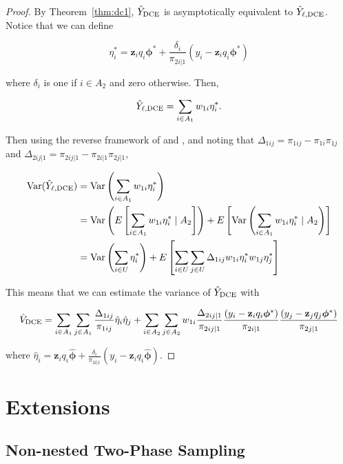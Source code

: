\documentclass[12pt]{article}
\newcommand{\Var}{{\text{Var}}}
\renewcommand{\bf}[1]{\mathbf{#1}}
\begin{document}
\begin{proof}
  By Theorem~\ref{thm:dc1}, $\hat Y_{\rm DCE}$ is asymptotically equivalent to
  $\hat Y_{\ell, \rm{DCE}}$. Notice that we can define

  $$
  \eta_i^* = 
  \bf z_i q_i \bm \phi^* + \frac{\delta_i}{\pi_{2i|1}}(y_i - \bf z_i q_i \bm \phi^*)
  $$

  where $\delta_i$ is one if $i \in A_2$ and zero otherwise. Then,

  $$
  \hat Y_{\ell, \rm{DCE}} = \sum_{i \in A_1} w_{1i} \eta_i^*.
  $$

  Then using the reverse framework of \cite{fay1992inferences} and 
  \cite{shao1999variance}, and noting that 
  $\Delta_{1ij} = \pi_{1ij} - \pi_{1i}\pi_{1j}$ and 
  $\Delta_{2ij|1} = \pi_{2ij|1} - \pi_{2i|1}\pi_{2j|1}$,

  \begin{align*}
    \Var(\hat Y_{\ell, \rm{DCE}}) 
    &= \Var\left(\sum_{i \in A_1} w_{1i} \eta_i^*\right) \\
    &= \Var\left(E\left[\sum_{i \in A_1} w_{1i} \eta_i^* \mid A_2 \right]\right) 
    + E\left[\Var\left(\sum_{i \in A_1} w_{1i} \eta_i^* \mid A_2 \right)\right] \\
    &= \Var\left(\sum_{i \in U} \eta_i^*\right) 
    + E\left[\sum_{i \in U} \sum_{j \in U} \Delta_{1ij} w_{1i} \eta_i^* w_{1j}
      \eta_j^*\right]\\
  \end{align*}

  This means that we can estimate the variance of $\hat Y_{\rm DCE}$ with

  $$
  \hat V_{\rm DCE} 
  = \sum_{i \in A_1} \sum_{j \in A_1} \frac{\Delta_{1ij}}{\pi_{1ij}} 
  \hat \eta_i \hat \eta_j
  + \sum_{i \in A_2} \sum_{j \in A_2} w_{1i} \frac{\Delta_{2ij|1}}{\pi_{2ij|1}} 
  \frac{(y_i - \bf z_i q_i \bm \phi^*)}{\pi_{2i|1}}
  \frac{(y_j - \bf z_j q_j \bm \phi^*)}{\pi_{2j|1}}
  $$

  where $\hat \eta_i = \bf z_i q_i \hat{\bm \phi} + 
  \frac{\delta_i}{\pi_{2i|1}}(y_i - \bf z_i q_i \hat{\bm \phi})$.

\end{proof}

\section{Extensions}
\subsection{Non-nested Two-Phase Sampling}
\end{document}
